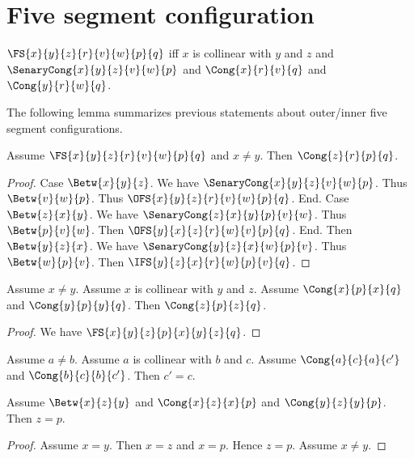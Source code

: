 \documentclass[10pt,a4paper,parskip=half,numbers=endperiod,parskip]{scrartcl}
\begin{document}
  \section{Five segment configuration}

  \begin{forthel}
    \begin{definition} %
      $\FS{x}{y}{z}{r}{v}{w}{p}{q}$ iff
      $x$ is collinear with $y$ and $z$ and
      $\SenaryCong{x}{y}{z}{v}{w}{p}$ and
      $\Cong{x}{r}{v}{q}$ and
      $\Cong{y}{r}{w}{q}$.
    \end{definition}
  \end{forthel}

  The following lemma summarizes previous statements
  about outer/inner five segment configurations.

  \begin{forthel}
    \begin{lemma} %
      Assume $\FS{x}{y}{z}{r}{v}{w}{p}{q}$ and $x \neq y$.
      Then $\Cong{z}{r}{p}{q}$.
    \end{lemma}
    \begin{proof}
      Case $\Betw{x}{y}{z}$.
        We have $\SenaryCong{x}{y}{z}{v}{w}{p}$.
        Thus $\Betw{v}{w}{p}$.
        Thus $\OFS{x}{y}{z}{r}{v}{w}{p}{q}$.
      End.
      Case $\Betw{z}{x}{y}$.
        We have $\SenaryCong{z}{x}{y}{p}{v}{w}$.
        Thus $\Betw{p}{v}{w}$.
        Then $\OFS{y}{x}{z}{r}{w}{v}{p}{q}$.
      End.
      Then $\Betw{y}{z}{x}$.
        We have $\SenaryCong{y}{z}{x}{w}{p}{v}$.
        Thus $\Betw{w}{p}{v}$.
        Then $\IFS{y}{z}{x}{r}{w}{p}{v}{q}$.
    \end{proof}
  \end{forthel}

  \begin{forthel}
    \begin{lemma} %
      Assume $x \neq y$.
      Assume $x$ is collinear with $y$ and $z$.
      Assume
      $\Cong{x}{p}{x}{q}$ and
      $\Cong{y}{p}{y}{q}$.
      Then $\Cong{z}{p}{z}{q}$.
    \end{lemma}
    \begin{proof}
    	We have $\FS{x}{y}{z}{p}{x}{y}{z}{q}$.
    \end{proof}


    \begin{lemma} %
      Assume $a \neq b$.
      Assume $a$ is collinear with $b$ and $c$.
      Assume $\Cong{a}{c}{a}{c'}$ and $\Cong{b}{c}{b}{c'}$.
      Then $c' = c$.
    \end{lemma}

    \begin{lemma} %
      Assume $\Betw{x}{z}{y}$ and $\Cong{x}{z}{x}{p}$ and $\Cong{y}{z}{y}{p}$.
      Then $z = p$.
    \end{lemma}
    \begin{proof}
      Assume $x = y$. Then $x = z$ and $x = p$. Hence $z = p$. Assume $x \neq y$.
    \end{proof}
  \end{forthel}
\end{document}
